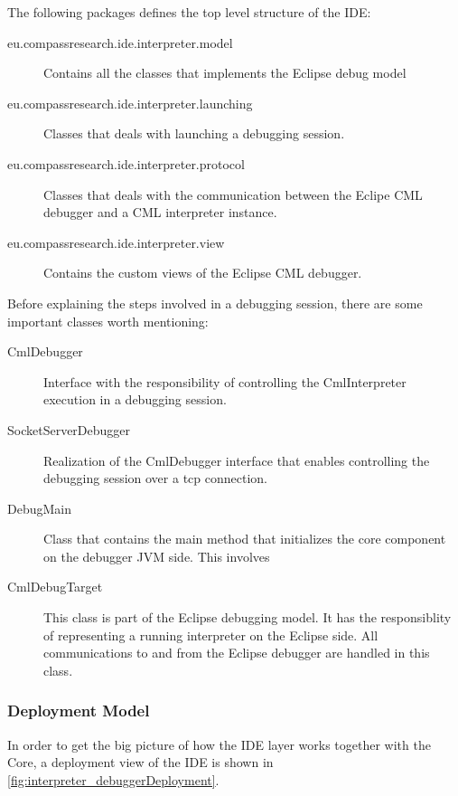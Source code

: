 \documentclass[a4paper, 10pt]{include/compassreport}   %
\begin{document}
The following packages defines the top level structure of the IDE:
\begin{description}
\item[eu.compassresearch.ide.interpreter.model] Contains all the
classes that implements the Eclipse debug model
\cite{Wright:2004:Online}

\item[eu.compassresearch.ide.interpreter.launching] Classes that deals
with launching a debugging session.
\item[eu.compassresearch.ide.interpreter.protocol] Classes that deals
with the communication between the Eclipe CML debugger and a CML
interpreter instance. 

\item[eu.compassresearch.ide.interpreter.view] Contains the custom
views of the Eclipse CML debugger.

\end{description}

Before explaining the steps involved in a debugging session, there are
some important classes worth mentioning:

\begin{description}
\item[CmlDebugger] Interface with the responsibility of
  controlling the CmlInterpreter execution in a debugging session.
\item[SocketServerDebugger] Realization of the CmlDebugger interface
that enables controlling the debugging session over a tcp connection. 
\item[DebugMain] Class that contains the main method that initializes
the core component on the debugger JVM side. This involves
\item[CmlDebugTarget] This class is part of the Eclipse
  debugging model. It has the responsiblity of representing a running
  interpreter on the Eclipse side. All communications to and from
  the Eclipse debugger are handled in this class.
\end{description}

\subsubsection{Deployment Model}
In order to get the big picture of how the IDE layer works together
with the Core, a deployment view of the IDE is shown in
\autoref{fig:interpreter_debuggerDeployment}.
\end{document}
